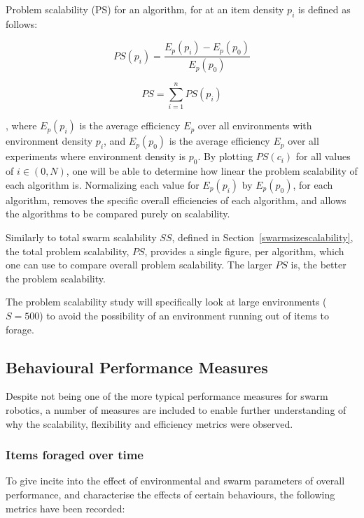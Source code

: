 Problem scalability (PS) for an algorithm, for at an item density $p_i$ is defined as follows:

\begin{equation}
	PS(p_i) = \dfrac{E_p(p_i)-E_p(p_0)}{E_p(p_0)}
\end{equation}

\begin{equation}
	PS = \sum_{i=1}^{n} PS(p_i)
\end{equation}

, where $E_p(p_i)$ is the average efficiency $E_p$ over all environments with environment density $p_i$, and $E_p(p_0)$ is the average efficiency $E_p$ over all experiments where environment density is $p_0$. By plotting $PS(c_i)$ for all values of $i\in(0,N)$, one will be able to determine how linear the problem scalability of each algorithm is. Normalizing each value for $E_p(p_i)$ by $E_p(p_0)$, for each algorithm, removes the specific overall efficiencies of each algorithm, and allows the algorithms to be compared purely on scalability.

Similarly to total swarm scalability $SS$, defined in Section~\ref{swarmsizescalability}, the total problem scalability, $PS$, provides a single figure, per algorithm, which one can use to compare overall problem scalability. The larger $PS$ is, the better the problem scalability.

The problem scalability study will specifically look at large environments ($S=500$) to avoid the possibility of an environment running out of items to forage.

\subsection{Behavioural Performance Measures}
\label{behaviouralperformancemeasures}

Despite not being one of the more typical performance measures for swarm robotics, a number of measures are included to enable further understanding of why the scalability, flexibility and efficiency metrics were observed.

\subsubsection{Items foraged over time}
To give incite into the effect of environmental and swarm parameters of overall performance, and characterise the effects of certain behaviours, the following metrics have been recorded:

